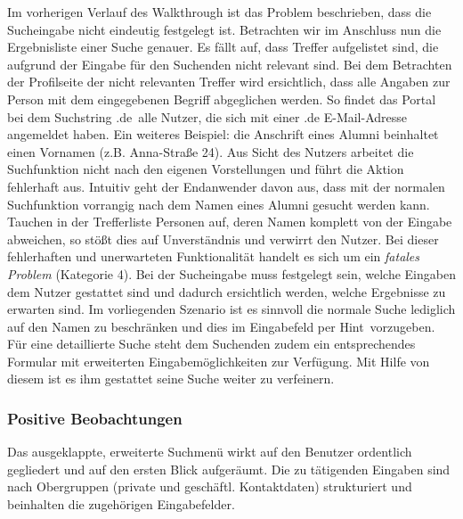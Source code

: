 {
	Im vorherigen Verlauf des Walkthrough ist das Problem beschrieben, dass die Sucheingabe nicht eindeutig festgelegt ist. Betrachten wir im Anschluss nun die Ergebnisliste einer Suche genauer. Es fällt auf, dass Treffer aufgelistet sind, die aufgrund der Eingabe für den Suchenden nicht relevant sind. Bei dem Betrachten der Profilseite der nicht relevanten Treffer wird ersichtlich, dass alle Angaben zur Person mit dem eingegebenen Begriff abgeglichen werden. So findet das Portal bei dem Suchstring \glqq .de\grqq ~alle Nutzer, die sich mit einer .de E-Mail-Adresse angemeldet haben. Ein weiteres Beispiel: die Anschrift eines Alumni beinhaltet einen Vornamen (z.B. Anna-Straße 24).
}
{
	Aus Sicht des Nutzers arbeitet die Suchfunktion nicht nach den eigenen Vorstellungen und führt die Aktion fehlerhaft aus. Intuitiv geht der Endanwender davon aus, dass mit der normalen Suchfunktion vorrangig nach dem Namen eines Alumni gesucht werden kann. Tauchen in der Trefferliste Personen auf, deren Namen komplett von der Eingabe abweichen, so stößt dies auf Unverständnis und verwirrt den Nutzer. Bei dieser fehlerhaften und unerwarteten Funktionalität handelt es sich um ein \emph{fatales Problem} (Kategorie 4).
}
{
	Bei der Sucheingabe muss festgelegt sein, welche Eingaben dem Nutzer gestattet sind und dadurch ersichtlich werden, welche Ergebnisse zu erwarten sind. Im vorliegenden Szenario ist es sinnvoll die normale Suche lediglich auf den Namen zu beschränken und dies im Eingabefeld per \glqq Hint\grqq ~vorzugeben. Für eine detaillierte Suche steht dem Suchenden zudem ein entsprechendes Formular mit erweiterten Eingabemöglichkeiten zur Verfügung. Mit Hilfe von diesem ist es ihm gestattet seine Suche weiter zu verfeinern.
} 
\label{prob:suche:sucheallefelder}


\subsubsection*{Positive Beobachtungen}
Das ausgeklappte, erweiterte Suchmenü wirkt auf den Benutzer ordentlich gegliedert und auf den ersten Blick aufgeräumt. Die zu tätigenden Eingaben sind nach Obergruppen (private und geschäftl. Kontaktdaten) strukturiert und beinhalten die zugehörigen Eingabefelder.

